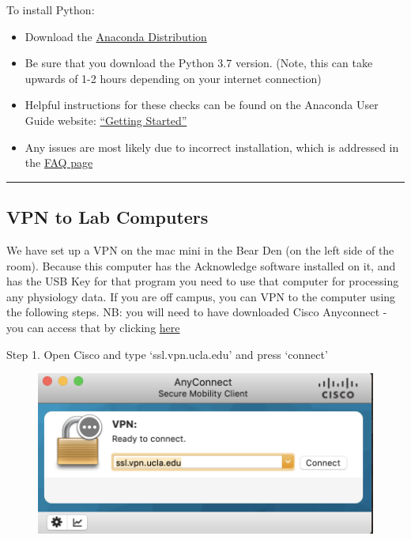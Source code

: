 \documentclass[]{book}
\providecommand{\tightlist}{%
  \setlength{\itemsep}{0pt}\setlength{\parskip}{0pt}}
\begin{document}
To install Python:

\begin{itemize}
\tightlist
\item
  Download the \href{https://www.anaconda.com/distribution/}{Anaconda Distribution}
\item
  Be sure that you download the Python 3.7 version. (Note, this can take upwards of 1-2 hours depending on your internet connection)
\item
  Helpful instructions for these checks can be found on the Anaconda User Guide website: \href{https://docs.anaconda.com/anaconda/user-guide/getting-started/}{``Getting Started''}
\item
  Any issues are most likely due to incorrect installation, which is addressed in the \href{https://docs.anaconda.com/anaconda/user-guide/faq/}{FAQ page}
\end{itemize}

\begin{center}\rule{0.5\linewidth}{0.5pt}\end{center}

\hypertarget{vpn-to-lab-computers}{%
\subsection{VPN to Lab Computers}\label{vpn-to-lab-computers}}

We have set up a VPN on the mac mini in the Bear Den (on the left side of the room).
Because this computer has the Acknowledge software installed on it, and has the USB Key for that program you need to use that computer for processing any physiology data. If you are off campus, you can VPN to the computer using the following steps. NB: you will need to have downloaded Cisco Anyconnect - you can access that by clicking \href{https://www.it.ucla.edu/it-support-center/services/virtual-private-network-vpn-clients}{here}

Step 1. Open Cisco and type `ssl.vpn.ucla.edu' and press `connect'

\begin{figure}
\centering
\includegraphics{images/lab_protocols/cisco/1.png}
\caption{}
\end{figure}
\end{document}

